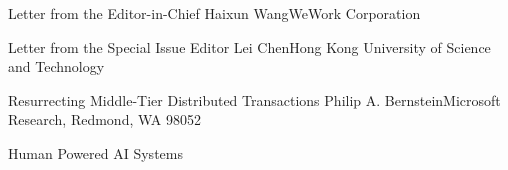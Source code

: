 \documentclass[11pt]{article}
\begin{document}


\begin{bulletin}


%
%

\begin{lettersection}
\begin{letter}{Letter from the Editor-in-Chief}
{Haixun Wang}{WeWork Corporation}

\end{letter}
%
\newpage
%
%
\begin{letter}{Letter from the Special Issue Editor}
{Lei Chen}{Hong Kong University of Science and Technology}

\end{letter}

\end{lettersection}


\begin{opinionsection}
\begin{opinion}{Resurrecting Middle-Tier Distributed Transactions}
{Philip A. Bernstein}{Microsoft Research, Redmond, WA 98052}

\end{opinion}
\end{opinionsection}

\begin{articlesection}{Human Powered AI Systems}


\end{articlesection}
\end{bulletin}
\end{document}
